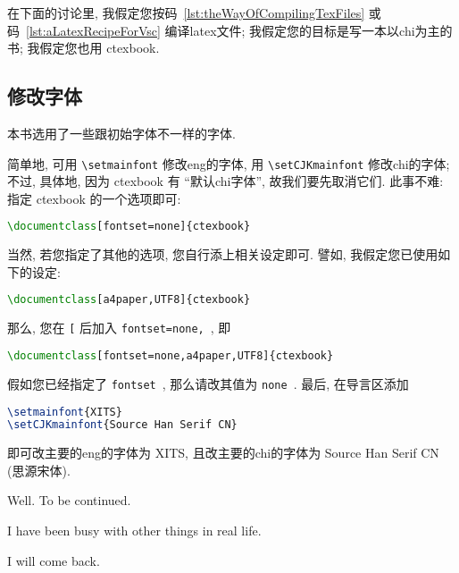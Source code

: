 在下面的讨论里,
我假定您按码~\ref{lst:theWayOfCompilingTexFiles}
或码~\ref{lst:aLatexRecipeForVsc}
编译\gls{latex}文件;
我假定您的目标是写一本以\gls{chi}为主的书;
我假定您也用 \textsf{ctexbook}.

\subsection{修改字体}

本书选用了一些跟初始字体不一样的字体.

简单地, 可用 \verb`\setmainfont` 修改\gls{eng}的字体,
用 \verb`\setCJKmainfont` 修改\gls{chi}的字体;
不过, 具体地,
因为 \textsf{ctexbook} 有 ``默认\gls{chi}字体'',
故我们要先取消它们.
此事不难:
指定 \textsf{ctexbook} 的一个选项即可:
\begin{lstlisting}[language=TeX]
\documentclass[fontset=none]{ctexbook}
\end{lstlisting}
当然, 若您指定了其他的选项, 您自行添上相关设定即可.
譬如, 我假定您已使用如下的设定:
\begin{lstlisting}[language=TeX]
\documentclass[a4paper,UTF8]{ctexbook}
\end{lstlisting}
那么, 您在 \verb`[` 后加入 \verb`fontset=none,`~, 即
\begin{lstlisting}[language=TeX]
\documentclass[fontset=none,a4paper,UTF8]{ctexbook}
\end{lstlisting}
假如您已经指定了 \verb`fontset`~,
那么请改其值为 \verb`none`~.
最后, 在导言区添加
\begin{lstlisting}[language=TeX]
\setmainfont{XITS}
\setCJKmainfont{Source Han Serif CN}
\end{lstlisting}
即可改主要的\gls{eng}的字体为 XITS,
且改主要的\gls{chi}的字体为 Source Han Serif CN (思源宋体).

\vspace*{4ex}

Well. To be continued.

I have been busy with other things in real life.

I will come back.
